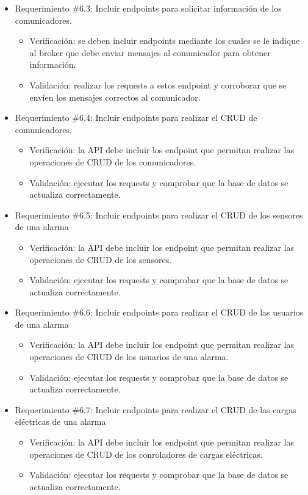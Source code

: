 \documentclass[
11pt, %
codirector, %
]{charter}
\begin{document}
\begin{itemize}
	\item Requerimiento \#6.3: Incluir endpoints para solicitar información de los comunicadores.
	\begin{itemize}
		\item Verificación: se deben incluir endpoints mediante los cuales se le indique al broker que debe enviar mensajes al comunicador para obtener información.
		\item Validación: realizar los requests a estos endpoint y corroborar que se envíen los mensajes correctos al comunicador.
	\end{itemize}
			
	\item Requerimiento \#6.4: Incluir endpoints para realizar el CRUD de comunicadores.
	\begin{itemize}
		\item Verificación: la API debe incluir los endpoint que permitan realizar las operaciones de CRUD de los comunicadores.
		\item Validación: ejecutar los requests y comprobar que la base de datos se actualiza correctamente.
	\end{itemize}
			
	\item Requerimiento \#6.5: Incluir endpoints para realizar el CRUD de los sensores de una alarma
	\begin{itemize}
		\item Verificación: la API debe incluir los endpoint que permitan realizar las operaciones de CRUD de los sensores.
		\item Validación: ejecutar los requests y comprobar que la base de datos se actualiza correctamente.
	\end{itemize}
			
	\item Requerimiento \#6.6: Incluir endpoints para realizar el CRUD de las usuarios de una alarma
	\begin{itemize}
		\item Verificación: la API debe incluir los endpoint que permitan realizar las operaciones de CRUD de los usuarios de una alarma.
		\item Validación: ejecutar los requests y comprobar que la base de datos se actualiza correctamente.
	\end{itemize}
			
	\item Requerimiento \#6.7: Incluir endpoints para realizar el CRUD de las cargas eléctricas de una alarma
	\begin{itemize}
		\item Verificación: la API debe incluir los endpoint que permitan realizar las operaciones de CRUD de los conroladores de cargas eléctricas.
		\item Validación: ejecutar los requests y comprobar que la base de datos se actualiza correctamente.
	\end{itemize}
			

\end{itemize}
\end{document}
